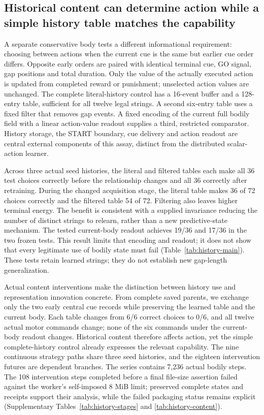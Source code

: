 \subsection*{Historical content can determine action while a simple history table matches the capability}

A separate conservative body tests a different informational requirement: choosing between actions when the current cue is the same but earlier cue order differs. Opposite early orders are paired with identical terminal cue, GO signal, gap positions and total duration. Only the value of the actually executed action is updated from completed reward or punishment; unselected action values are unchanged. The complete literal-history control has a 16-event buffer and a 128-entry table, sufficient for all twelve legal strings. A second six-entry table uses a fixed filter that removes gap events. A fixed encoding of the current full bodily field with a linear action-value readout supplies a third, restricted comparator. History storage, the START boundary, cue delivery and action readout are central external components of this assay, distinct from the distributed scalar-action learner.

Across three actual seed histories, the literal and filtered tables each make all 36 test choices correctly before the relationship changes and all 36 correctly after retraining. During the changed acquisition stage, the literal table makes 36 of 72 choices correctly and the filtered table 54 of 72. Filtering also leaves higher terminal energy. The benefit is consistent with a supplied invariance reducing the number of distinct strings to relearn, rather than a new predictive-state mechanism. The tested current-body readout achieves 19/36 and 17/36 in the two frozen tests. This result limits that encoding and readout; it does not show that every legitimate use of bodily state must fail (Table~\ref{tab:history-main}). These tests retain learned strings; they do not establish new gap-length generalization.

Actual content interventions make the distinction between history use and representation innovation concrete. From complete saved parents, we exchange only the two early central cue records while preserving the learned table and the current body. Each table changes from 6/6 correct choices to 0/6, and all twelve actual motor commands change; none of the six commands under the current-body readout changes. Historical content therefore affects action, yet the simple complete-history control already expresses the relevant capability. The nine continuous strategy paths share three seed histories, and the eighteen intervention futures are dependent branches. The series contains 7,236 actual bodily steps. The 108 intervention steps completed before a final file-size assertion failed against the worker's self-imposed 8 MiB limit; preserved complete states and receipts support their analysis, while the failed packaging status remains explicit (Supplementary Tables~\ref{tab:history-stages} and \ref{tab:history-content}).


